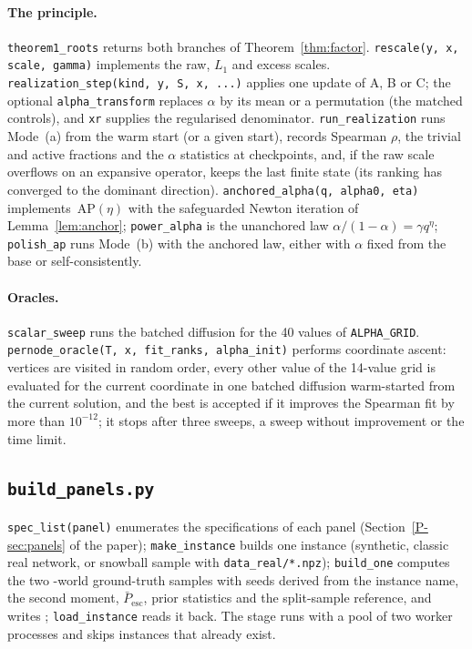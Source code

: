 \documentclass[11pt,a4paper]{article}
\theoremstyle{definition}
\theoremstyle{plain}
\newcommand{\Pescbar}{\bar{P}_{\mathrm{esc}}}
\newcommand{\AP}{\mathrm{AP}}
\newcommand{\file}[1]{\path{#1}}
\begin{document}
\paragraph{The principle.} \texttt{theorem1\_roots} returns both branches of Theorem~\ref{thm:factor}. \texttt{rescale(y, x, scale, gamma)} implements the raw, $L_1$ and excess scales. \texttt{realization\_step(kind, y, S, x, ...)} applies one update of A, B or C; the optional \texttt{alpha\_transform} replaces $\alpha$ by its mean or a permutation (the matched controls), and \texttt{xr} supplies the regularised denominator. \texttt{run\_realization} runs Mode~(a) from the warm start (or a given start), records Spearman $\rho$, the trivial and active fractions and the $\alpha$ statistics at checkpoints, and, if the raw scale overflows on an expansive operator, keeps the last finite state (its ranking has converged to the dominant direction). \texttt{anchored\_alpha(q, alpha0, eta)} implements~$\AP(\eta)$ with the safeguarded Newton iteration of Lemma~\ref{lem:anchor}; \texttt{power\_alpha} is the unanchored law $\alpha/(1-\alpha)=\gamma q^\eta$; \texttt{polish\_ap} runs Mode~(b) with the anchored law, either with $\alpha$ fixed from the base or self-consistently.

\paragraph{Oracles.} \texttt{scalar\_sweep} runs the batched diffusion for the 40 values of \texttt{ALPHA\_GRID}. \texttt{pernode\_oracle(T, x, fit\_ranks, alpha\_init)} performs coordinate ascent: vertices are visited in random order, every other value of the 14-value grid is evaluated for the current coordinate in one batched diffusion warm-started from the current solution, and the best is accepted if it improves the Spearman fit by more than $10^{-12}$; it stops after three sweeps, a sweep without improvement or the time limit.

\subsection{\texorpdfstring{\texttt{build\_panels.py}}{build\_panels.py}}

\texttt{spec\_list(panel)} enumerates the specifications of each panel (Section~\ref*{P-sec:panels} of the paper); \texttt{make\_instance} builds one instance (synthetic, classic real network, or snowball sample with \texttt{data\_real/*.npz}); \texttt{build\_one} computes the two \MGT-world ground-truth samples with seeds derived from the instance name, the second moment, $\Pescbar$, prior statistics and the split-sample reference, and writes \file{data/<panel>/NNNN.npz}; \texttt{load\_instance} reads it back. The stage runs with a pool of two worker processes and skips instances that already exist.
\end{document}
